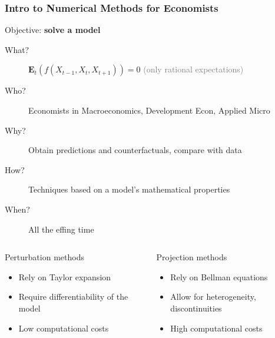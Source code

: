 \documentclass[10pt, aspectratio=1610]{beamer}
\newcommand{\E}{\mathbf{E}}
\begin{document}
  \begin{frame}
    \frametitle{Intro to Numerical Methods for Economists}

    Objective: \textbf{solve a model}

    \vfill\pause

    \begin{description}
      \item[What?] $\E_t \left( f \left( X_{t-1}, X_t, X_{t+1} \right) \right) = 0$ \hspace{2em} \textcolor{gray}{(only rational expectations)}
      \pause
      \item[Who?] Economists in Macroeconomics, Development Econ, Applied Micro
      \pause
      \item[Why?] Obtain predictions and counterfactuals, compare with data
      \pause
      \item[How?] Techniques based on a model's mathematical properties
      \pause
      \item[When?] All the effing time
    \end{description}

    \vfill\pause

    \begin{columns}
      \begin{column}{0.475\textwidth}
        \begin{block}{Perturbation methods}
          \begin{itemize}
            \item Rely on Taylor expansion
            \item Require differentiability of the model
            \item Low computational costs
          \end{itemize}
        \end{block}
      \end{column}
      \begin{column}{0.475\textwidth}
        \begin{block}{Projection methods}
          \begin{itemize}
            \item Rely on Bellman equations
            \item Allow for heterogeneity, discontinuities
            \item High computational costs
          \end{itemize}
        \end{block}
      \end{column}
    \end{columns}

  \end{frame}
\end{document}
